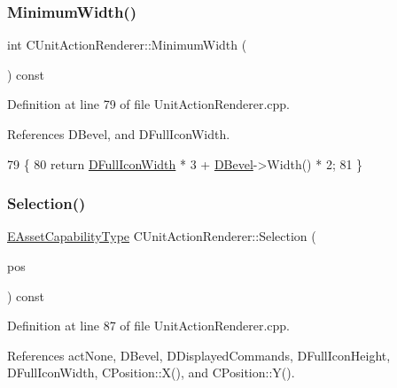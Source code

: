 \subsubsection{\texorpdfstring{Minimum\+Width()}{MinimumWidth()}}
{\footnotesize\ttfamily int C\+Unit\+Action\+Renderer\+::\+Minimum\+Width (\begin{DoxyParamCaption}{ }\end{DoxyParamCaption}) const}



Definition at line 79 of file Unit\+Action\+Renderer.\+cpp.



References D\+Bevel, and D\+Full\+Icon\+Width.


\begin{DoxyCode}
79                                            \{
80     \textcolor{keywordflow}{return} \hyperlink{classCUnitActionRenderer_a67e5c1650ef8f849c05d9f059d12fb95}{DFullIconWidth} * 3 + \hyperlink{classCUnitActionRenderer_a3f4012557f7f4d71cfa02df725984ebb}{DBevel}->Width() * 2;
81 \}
\end{DoxyCode}
\hypertarget{classCUnitActionRenderer_a41108fd092035a22f7ecd75b18f045a7}{}\label{classCUnitActionRenderer_a41108fd092035a22f7ecd75b18f045a7} 
\subsubsection{\texorpdfstring{Selection()}{Selection()}}
{\footnotesize\ttfamily \hyperlink{GameDataTypes_8h_a35b98ce26aca678b03c6f9f76e4778ce}{E\+Asset\+Capability\+Type} C\+Unit\+Action\+Renderer\+::\+Selection (\begin{DoxyParamCaption}\item[{const \hyperlink{classCPosition}{C\+Position} \&}]{pos }\end{DoxyParamCaption}) const}



Definition at line 87 of file Unit\+Action\+Renderer.\+cpp.



References act\+None, D\+Bevel, D\+Displayed\+Commands, D\+Full\+Icon\+Height, D\+Full\+Icon\+Width, C\+Position\+::\+X(), and C\+Position\+::\+Y().


